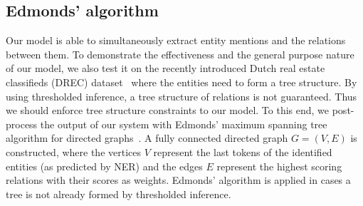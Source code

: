 \documentclass[a4paper,UTF8,no-math,zihao=-4]{ctexart}
\begin{document}
\subsection{Edmonds' algorithm}


Our model is able to simultaneously extract entity mentions and the relations between them. To demonstrate the effectiveness and the general purpose nature of our model, we also test it on the recently introduced Dutch real estate classifieds (DREC) dataset~\citep{bekoulis:17} where the entities need to form a tree structure. By using thresholded inference, a tree structure of relations is not guaranteed. Thus we should enforce tree structure constraints to our model. To this end, we post-process the output of our system with Edmonds' maximum spanning tree algorithm for directed graphs~\citep{chu:65,edmond:68}. A fully connected directed graph $G = (V, E)$ is constructed, where the vertices $V$ represent the last tokens of the identified entities (as predicted by NER) and the edges $E$ represent the highest scoring relations with their scores as weights. Edmonds' algorithm is applied in cases a tree is not already formed by thresholded inference.
	
\end{document}
